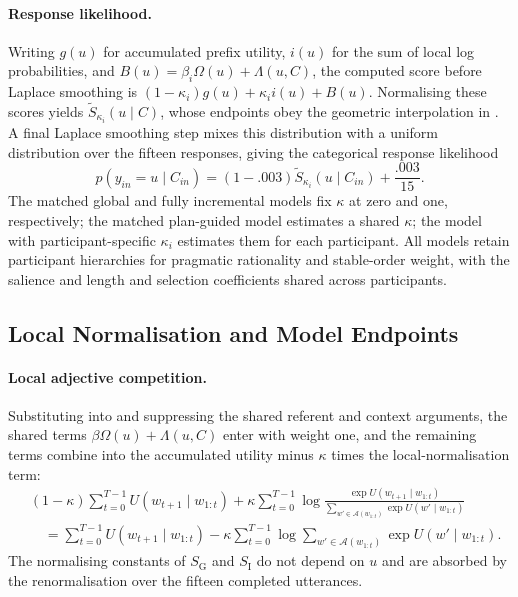 \documentclass[10pt,a4paper,fleqn]{article}
\begin{document}
\paragraph{Response likelihood.}
Writing $g(u)$ for accumulated prefix utility, $i(u)$ for the sum of local log probabilities, and $B(u)=\beta_i\Omega(u)+\Lambda(u,C)$, the computed score before Laplace smoothing is $(1-\kappa_i)g(u)+\kappa_i i(u)+B(u)$.
Normalising these scores yields $\widetilde S_{\kappa_i}(u\mid C)$, whose endpoints obey the geometric interpolation in .
A final Laplace smoothing step mixes this distribution with a uniform distribution over the fifteen responses, giving the categorical response likelihood
\begin{equation}
 p(y_{in}=u\mid C_{in})=(1-.003)\widetilde S_{\kappa_i}(u\mid C_{in})+\frac{.003}{15}.
\end{equation}
The matched global and fully incremental models fix $\kappa$ at zero and one, respectively; the matched plan-guided model estimates a shared $\kappa$; the model with participant-specific $\kappa_i$ estimates them for each participant.
All models retain participant hierarchies for pragmatic rationality and stable-order weight, with the salience and length and selection coefficients shared across participants.

\subsection{Local Normalisation and Model Endpoints}
\label{sec:appendix:normalisation-audit}

\paragraph{Local adjective competition.}
Substituting  into  and suppressing the shared referent and context arguments, the shared terms $\beta\Omega(u)+\Lambda(u,C)$ enter with weight one, and the remaining terms combine into the accumulated utility minus $\kappa$ times the local-normalisation term:
\begin{equation}
\begin{aligned}
  &(1-\kappa)\sum_{t=0}^{T-1}U(w_{t+1}\mid w_{1:t})
   +\kappa\sum_{t=0}^{T-1}\log
   \frac{\exp U(w_{t+1}\mid w_{1:t})}
        {\sum_{w'\in\mathcal A(w_{1:t})}\exp U(w'\mid w_{1:t})}\\
  &\quad=\sum_{t=0}^{T-1}U(w_{t+1}\mid w_{1:t})
   -\kappa\sum_{t=0}^{T-1}\log\!\sum_{w'\in\mathcal A(w_{1:t})}\exp U(w'\mid w_{1:t}).
\end{aligned}
\label{eq:local-normalisation}
\end{equation}
The normalising constants of $S_{\mathrm{G}}$ and $S_{\mathrm{I}}$ do not depend on $u$ and are absorbed by the renormalisation over the fifteen completed utterances.
\end{document}
